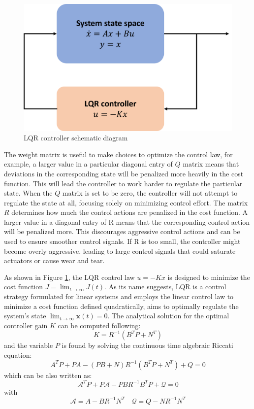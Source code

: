 \begin{figure}
    \centering
    \includegraphics[width=0.5\linewidth]{fig/lqr_control_example.png}
    \caption{LQR controller schematic diagram}
    \label{fig: LQR controller schematic diagram}
\end{figure}

The weight matrix is useful to make choices to optimize the control law, for example, a larger value in a particular diagonal entry of $Q$ matrix means that deviations in the corresponding state will be penalized more heavily in the cost function. This will lead the controller to work harder to regulate the particular state. When the $Q$ matrix is set to be zero, the controller will not attempt to regulate the state at all, focusing solely on minimizing control effort. The matrix $R$ determines how much the control actions are penalized in the cost function. A larger value in a diagonal entry of R means that the corresponding control action will be penalized more. This discourages aggressive control actions and can be used to ensure smoother control signals. If R is too small, the controller might become overly aggressive, leading to large control signals that could saturate actuators or cause wear and tear.

As shown in Figure \ref{fig: LQR controller schematic diagram}, the LQR control law $u = - K x$ is designed to minimize the cost function $J=\lim _{t \rightarrow \infty} J(t)$. As its name suggests, LQR is a control strategy formulated for linear systems and employs the linear control law to minimize a cost function defined quadratically, aims to optimally regulate the system's state $\lim _{t \rightarrow \infty} \mathbf{x}(t)=0$. The analytical solution for the optimal controller gain $K$ can be computed following:
\begin{equation}
    K=R^{-1}\left(B^T P+N^T\right)
\end{equation}
and the variable $P$ is found by solving the continuous time algebraic Riccati equation:
\begin{equation}
    A^T P+P A-(P B+N) R^{-1}\left(B^T P+N^T\right)+Q=0
\end{equation}
which can be also written as:
\begin{equation}
    \mathcal{A}^T P+P \mathcal{A}-P B R^{-1} B^T P+\mathcal{Q}=0
\end{equation}
with
\begin{equation}
    \mathcal{A}=A-B R^{-1} N^T \quad \mathcal{Q}=Q-N R^{-1} N^T
\end{equation}

